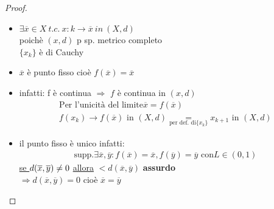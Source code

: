 \documentclass[a4paper, oneside]{article}
\begin{document}
\begin{proof}
\begin{itemize}
\begin{gather*}
                < d(x_0, f(x_0) \ (fix.)) \frac{L^n}{1-L} \xrightarrow{lim_n \to +\infty} \text{ poichè } L \in (0,1)\\
                \Rightarrow \forall \epsilon>0 \exists N: \text{\underbar{se }} m,n>N \text{\underbar{ allora }} d(x_m, x_n) < \epsilon \text{cioè } \{x_k\} \text{di Cauchy in } (x,d)
            \end{gather*}
            \item $\exists \overline{x} \in X \ t.c. \ x:k \to \overline{x} \ in \ (X,d)$\\
            poichè $(x,d)$ p sp. metrico completo\\
            $\{x_k\}$ è di Cauchy\\
            \item $\overline{x} $ è punto fisso cioè $f(\overline{x}) = \overline{x}$
            \item infatti: f è continua $\Rightarrow$ $f$ è continua in $(x,d)$\\
            \begin{gather*}
                \text{Per l'unicità del limite} \overline{x} = f(\overline{x})\\
                    f(x_k) \to f(\overline{x}) \text{ in } (X,d) \underset{\text{per def. di} \{x_k\}}{=} x_{k+1} \text{ in } (X,d)
            \end{gather*}
            \item il punto fisso è unico infatti:
             \begin{gather*}
                \text{supp.} \exists \overline{x}, \overline{y} : f(\overline{x}) = \overline{x}, f(\overline{y}) = \overline{y} \text{ con} L \in (0,1)
             \end{gather*}
             \underline{se } $d(\overline{x}, \overline{y}) \neq 0 \\$
             \underline{allora} $< d(\overline{x}, \overline{y})$ \textbf{assurdo}\\
             $\Rightarrow d(\overline{x}, \overline{y}) = 0$ cioè $\overline{x} = \overline{y}$
        \end{itemize}
    \end{proof}
\end{document}
